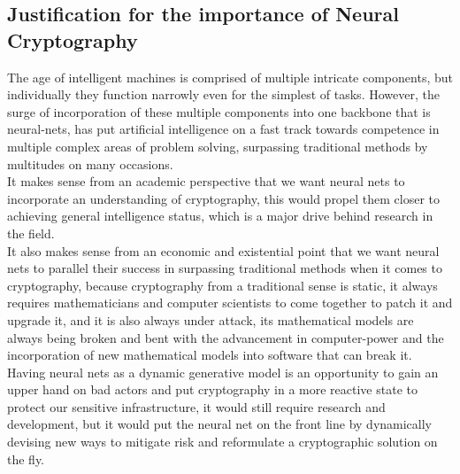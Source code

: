 \documentclass[a4paper, 12pt]{report}
\begin{document}
\subsection{\textbf{Justification for the importance of Neural Cryptography}}
The age of intelligent machines is comprised of multiple intricate components, but individually they function narrowly even for the simplest of tasks. However, the surge of incorporation of these multiple components into one backbone that is neural-nets, has put artificial intelligence on a fast track towards competence in multiple complex areas of problem solving, surpassing traditional methods by multitudes on many occasions.\\
It makes sense from an academic perspective that we want neural nets to incorporate an understanding of cryptography, this would propel them closer to achieving general intelligence status, which is a major drive behind research in the field.\\
It also makes sense from an economic and existential point that we want neural nets to parallel their success in surpassing traditional methods when it comes to cryptography, because cryptography from a traditional sense is static, it always requires mathematicians and computer scientists to come together to patch it and upgrade it, and it is also always under attack, its mathematical models are always being broken and bent with the advancement in computer-power and the incorporation of new mathematical models into software that can break it.
Having neural nets as a dynamic generative model is an opportunity to gain an upper hand on bad actors and put cryptography in a more reactive state to protect our sensitive infrastructure, it would still require research and development, but it would put the neural net on the front line by dynamically devising new ways to mitigate risk and reformulate a cryptographic solution on the fly.
\end{document}
